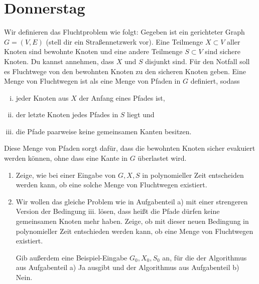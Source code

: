 \documentclass{uebung_cs}
\begin{document}
\section*{Donnerstag}

\begin{aufgabe}[Fluchtwege]
    Wir definieren das Fluchtproblem wie folgt: Gegeben ist ein gerichteter Graph $G = (V,E)$ (stell dir ein Straßennetzwerk vor). Eine Teilmenge $X \subset V$ aller Knoten sind bewohnte Knoten und eine andere Teilmenge $S \subset V$ sind sichere Knoten. Du kannst annehmen, dass $X$ und $S$ disjunkt sind. Für den Notfall soll es Fluchtwege von den bewohnten Knoten zu den sicheren Knoten geben. Eine Menge von Fluchtwegen ist als eine Menge von Pfaden in $G$ definiert, sodass
    \begin{enumerate}[i.]
      \item jeder Knoten aus $X$ der Anfang eines Pfades ist,
      \item der letzte Knoten jedes Pfades in $S$ liegt und
      \item die Pfade paarweise keine gemeinsamen Kanten besitzen.   
    \end{enumerate}
    Diese Menge von Pfaden sorgt dafür, dass die bewohnten Knoten sicher evakuiert werden können, ohne dass eine Kante in $G$ überlastet wird.
    \begin{enumerate}
    	\item Zeige, wie bei einer Eingabe von $G, X, S$ in polynomieller Zeit entscheiden werden kann, ob eine solche Menge von Fluchtwegen existiert.
    	\item Wir wollen das gleiche Problem wie in Aufgabenteil a) mit einer strengeren Version der Bedingung iii. lösen, dass heißt die Pfade dürfen keine gemeinsamen Knoten mehr haben.
    	Zeige, ob mit dieser neuen Bedingung in polynomieller Zeit entschieden werden kann, ob eine Menge von Fluchtwegen existiert.
    	
    	Gib außerdem eine Beispiel-Eingabe $G_0, X_0, S_0$ an, für die der Algorithmus aus Aufgabenteil a) \glqq Ja\grqq{} ausgibt und der Algorithmus aus Aufgabenteil b) \glqq Nein\grqq.
    \end{enumerate}
\end{aufgabe}
\end{document}
